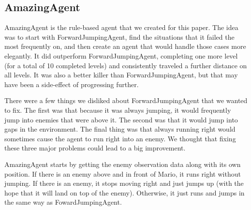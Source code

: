 \documentclass[12pt]{article}
\begin{document}
\begin{multicols*}{2}
\subsection*{AmazingAgent}
AmazingAgent is the rule-based agent that we created for this paper.  The idea was to start with 
ForwardJumpingAgent, find the situations that it failed the most frequently on, and then create 
an agent that would handle those cases more elegantly.  It did outperform ForwardJumpingAgent, 
completing one more level (for a total of 10 completed levels) and consistently traveled a further 
distance on all levels.  It was also a better killer than ForwardJumpingAgent, but that may have 
been a side-effect of progressing further.

There were a few things we disliked about ForwardJumpingAgent that we wanted to fix.  The 
first was that because it was always jumping, it would frequently jump into enemies that were above 
it.  The second was that it would jump into gaps in the environment.  The final thing was that always 
running right would sometimes cause the agent to run right into an enemy.  We thought that fixing these 
three major problems could lead to a big improvement.

AmazingAgent starts by getting the enemy observation data along with its own position.  If there is 
an enemy above and in front of Mario, it runs right without jumping.  If there is an enemy, it stops 
moving right and just jumps up (with the hope that it will land on top of the enemy).  Otherwise, 
it just runs and jumps in the same way as FowardJumpingAgent.


\end{multicols*}
\end{document}
